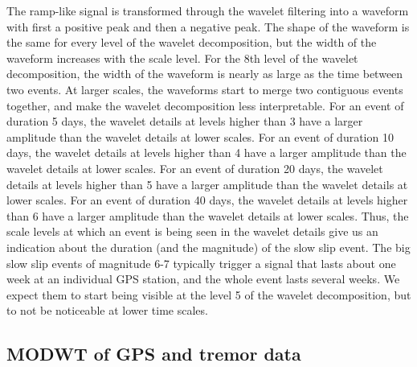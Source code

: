 \documentclass{article}
\begin{document}
The ramp-like signal is transformed through the wavelet filtering into a waveform with first a positive peak and then a negative peak. The shape of the waveform is the same for every level of the wavelet decomposition, but the width of the waveform increases with the scale level. For the 8th level of the wavelet decomposition, the width of the waveform is nearly as large as the time between two events. At larger scales, the waveforms start to merge two contiguous events together, and make the wavelet decomposition less interpretable. For an event of duration 5 days, the wavelet details at levels higher than 3 have a larger amplitude than the wavelet details at lower scales. For an event of duration 10 days, the wavelet details at levels higher than 4 have a larger amplitude than the wavelet details at lower scales. For an event of duration 20 days, the wavelet details at levels higher than 5 have a larger amplitude than the wavelet details at lower scales. For an event of duration 40 days, the wavelet details at levels higher than 6 have a larger amplitude than the wavelet details at lower scales. Thus, the scale levels at which an event is being seen in the wavelet details give us an indication about the duration (and the magnitude) of the slow slip event. The big slow slip events of magnitude 6-7 typically trigger a signal that lasts about one week at an individual GPS station, and the whole event lasts several weeks. We expect them to start being visible at the level 5 of the wavelet decomposition, but to not be noticeable at lower time scales. \\

\subsection{MODWT of GPS and tremor data}
\end{document}
